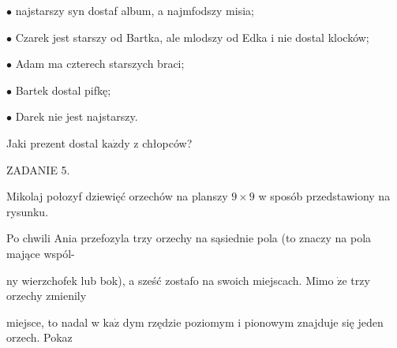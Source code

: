 \documentclass[a4paper,12pt]{article}
\begin{document}
$\bullet$ najstarszy syn dostaf album, a najmfodszy misia;

$\bullet$ Czarek jest starszy od Bartka, ale mlodszy od Edka i nie dostal klocków;

$\bullet$ Adam ma czterech starszych braci;

$\bullet$ Bartek dostal pifkę;

$\bullet$ Darek nie jest najstarszy.

Jaki prezent dostal $\mathrm{k}\mathrm{a}\dot{\mathrm{z}}\mathrm{d}\mathrm{y}$ z chłopców?

ZADANIE 5.

Mikolaj połozyf dziewięć orzechów na planszy $9 \times 9$ w sposób przedstawiony na rysunku.

Po chwili Ania przefozyla trzy orzechy na sąsiednie pola (to znaczy na pola mające wspól-

ny wierzchofek lub bok), a sześć zostafo na swoich miejscach. Mimo $\dot{\mathrm{z}}\mathrm{e}$ trzy orzechy zmienily

miejsce, to nadal w $\mathrm{k}\mathrm{a}\dot{\mathrm{z}}$ dym rzędzie poziomym i pionowym znajduje się jeden orzech. Pokaz
\end{document}
